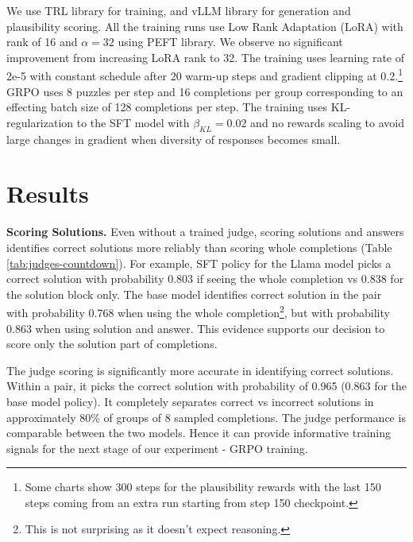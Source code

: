 \documentclass[12pt,a4paper]{article}
\begin{document}
We use TRL library for training,  and vLLM library for generation and plausibility scoring. All the training runs use Low Rank Adaptation (LoRA) \citep{hu_lora_2021} with rank of 16 and $\alpha=32$ using PEFT library. We observe no significant improvement from increasing LoRA rank to 32. The training uses learning rate of 2e-5 with constant schedule after 20 warm-up steps and gradient clipping at 0.2.\footnote{Some charts show 300 steps for the plausibility rewards with the last 150 steps coming from an extra run starting from step 150 checkpoint.}  GRPO uses 8 puzzles per step and 16 completions per group corresponding to an effecting batch size of 128 completions per step. The training uses KL-regularization to the SFT model with $\beta_{KL}=0.02$ and no rewards scaling to avoid large changes in gradient when diversity of responses becomes small.




\vspace{10pt}

\section{Results}
\label{sec:trained-judges}
\textbf{Scoring Solutions.} Even without a trained judge, scoring solutions and answers identifies correct solutions more reliably than scoring whole completions (Table \ref{tab:judges-countdown}). For example, SFT policy for the Llama model picks a correct solution with probability 0.803 if seeing the whole completion vs 0.838 for the solution block only. The base model identifies correct solution in the pair with probability 0.768 when using the whole completion\footnote{This is not surprising as it doesn't expect reasoning.}, but with probability 0.863 when using solution and answer. This evidence supports our decision to score only the solution part of completions.



The judge scoring is significantly more accurate in identifying correct solutions. Within a pair, it picks the correct solution with probability of 0.965 (0.863 for the base model policy). It completely separates correct vs incorrect solutions in approximately 80\% of groups of 8 sampled completions. The judge performance is comparable between the two models. Hence it can provide informative training signals for the next stage of our experiment - GRPO training. 
\end{document}
